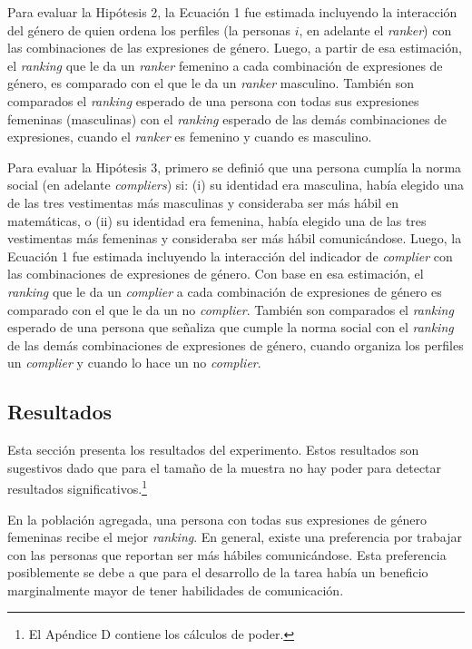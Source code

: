 Para evaluar la Hipótesis 2, la Ecuación 1 fue estimada incluyendo la interacción del género de quien ordena los perfiles (la personas $i$, en adelante el \textit{ranker}) con las combinaciones de las expresiones de género. Luego, a partir de esa estimación, el \textit{ranking} que le da un \textit{ranker} femenino  a cada combinación de expresiones de género, es comparado con el que le da un \textit{ranker} masculino. También son comparados el \textit{ranking} esperado de una persona con todas sus expresiones femeninas (masculinas) con el \textit{ranking} esperado de las demás combinaciones de expresiones, cuando el \textit{ranker} es femenino y cuando es masculino. 

Para evaluar la Hipótesis 3, primero se definió que una persona cumplía la norma social (en adelante \textit{compliers}) si: (i) su identidad era masculina, había elegido una de las tres vestimentas más masculinas y consideraba ser más hábil en matemáticas, o  (ii) su identidad era femenina, había elegido una de las tres vestimentas más femeninas y consideraba ser más hábil comunicándose. Luego, la Ecuación 1 fue estimada incluyendo la interacción del indicador de \textit{complier} con las combinaciones de expresiones de género. Con base en esa estimación, el \textit{ranking}  que le da un \textit{complier} a cada combinación de expresiones de género es comparado con el que le da un no \textit{complier}. También son comparados el \textit{ranking} esperado de una persona que señaliza que cumple la norma social con el \textit{ranking} de las demás combinaciones de expresiones de género, cuando organiza los perfiles un \textit{complier} y cuando lo hace un no \textit{complier}. 

\subsection{Resultados}
Esta sección presenta los resultados del experimento. Estos resultados son sugestivos dado que para el tamaño de la muestra no hay poder para detectar resultados significativos.\footnote{El Apéndice D contiene los cálculos de poder.}

En la población agregada, una persona con todas sus expresiones de género femeninas recibe el mejor \textit{ranking}. En general, existe una preferencia por trabajar con las personas que reportan ser más hábiles comunicándose. Esta preferencia posiblemente se debe a que para el desarrollo de la tarea había un beneficio marginalmente mayor  de tener habilidades de comunicación. 

